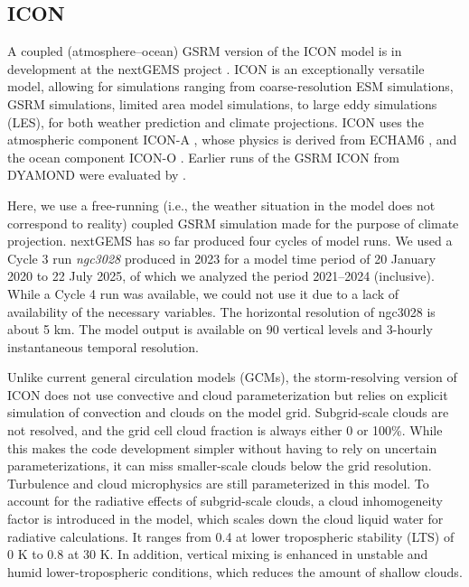 \documentclass[draft]{agujournal2019}
\begin{document}
\subsection{ICON}
\label{sec:icon}

A coupled (atmosphere--ocean) GSRM version of the ICON model is in development at the nextGEMS project . ICON is an exceptionally versatile model, allowing for simulations ranging from coarse-resolution ESM simulations, GSRM simulations, limited area model simulations, to large eddy simulations (LES), for both weather prediction and climate projections. ICON uses the atmospheric component ICON-A , whose physics is derived from ECHAM6 , and the ocean component ICON-O . Earlier runs of the GSRM ICON from DYAMOND were evaluated by .

Here, we use a free-running (i.e., the weather situation in the model does not correspond to reality) coupled GSRM simulation made for the purpose of climate projection. nextGEMS has so far produced four cycles of model runs. We used a Cycle 3 run \emph{ngc3028} produced in 2023  for a model time period of 20 January 2020 to 22 July 2025, of which we analyzed the period 2021--2024 (inclusive). While a Cycle 4 run was available, we could not use it due to a lack of availability of the necessary variables. The horizontal resolution of ngc3028 is about 5 km. The model output is available on 90 vertical levels and 3-hourly instantaneous temporal resolution.

Unlike current general circulation models (GCMs), the storm-resolving version of ICON does not use convective and cloud parameterization but relies on explicit simulation of convection and clouds on the model grid. Subgrid-scale clouds are not resolved, and the grid cell cloud fraction is always either 0 or 100\%. While this makes the code development simpler without having to rely on uncertain parameterizations, it can miss smaller-scale clouds below the grid resolution. Turbulence and cloud microphysics are still parameterized in this model. To account for the radiative effects of subgrid-scale clouds, a cloud inhomogeneity factor is introduced in the model, which scales down the cloud liquid water for radiative calculations. It ranges from 0.4 at lower tropospheric stability (LTS) of 0 K to 0.8 at 30 K. In addition, vertical mixing is enhanced in unstable and humid lower-tropospheric conditions, which reduces the amount of shallow clouds.
\end{document}

